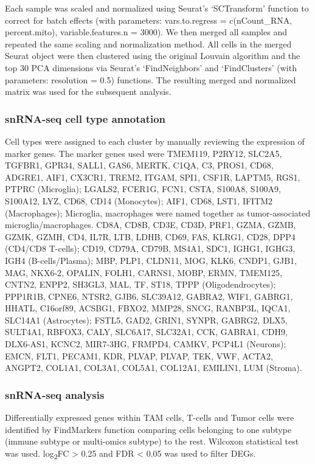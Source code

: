 Each sample was scaled and normalized using Seurat’s `SCTransform' function to correct for batch effects (with parameters: vars.to.regress = c(\textquotedbl{}nCount\_RNA\textquotedbl{}, \textquotedbl{}percent.mito\textquotedbl{}), variable.features.n = 3000). We then merged all samples and repeated the same scaling and normalization method. All cells in the merged Seurat object were then clustered using the original Louvain algorithm \cite{blondelvd_lefebvree:FastUnfolding2008} and the top 30 PCA dimensions via Seurat's `FindNeighbors' and `FindClusters' (with parameters: resolution = 0.5) functions. The resulting merged and normalized matrix was used for the subsequent analysis.

\subsubsection{snRNA-seq cell type annotation}
Cell types were assigned to each cluster by manually reviewing the expression of marker genes. The marker genes used were TMEM119, P2RY12, SLC2A5, TGFBR1, GPR34, SALL1, GAS6, MERTK, C1QA, C3, PROS1, CD68, ADGRE1, AIF1, CX3CR1, TREM2, ITGAM, SPI1, CSF1R, LAPTM5, RGS1, PTPRC (Microglia); LGALS2, FCER1G, FCN1, CSTA, S100A8, S100A9, S100A12, LYZ, CD68, CD14 (Monocytes); AIF1, CD68, LST1, IFITM2 (Macrophages); Microglia, macrophages were named together as tumor-associated microglia/macrophages. CD8A, CD8B, CD3E, CD3D, PRF1, GZMA, GZMB, GZMK, GZMH, CD4, IL7R, LTB, LDHB, CD69, FAS, KLRG1, CD28, DPP4 (CD4/CD8 T-cells); CD19, CD79A, CD79B, MS4A1, SDC1, IGHG1, IGHG3, IGH4 (B-cells/Plasma); MBP, PLP1, CLDN11, MOG, KLK6, CNDP1, GJB1, MAG, NKX6-2, OPALIN, FOLH1, CARNS1, MOBP, ERMN, TMEM125, CNTN2, ENPP2, SH3GL3, MAL, TF, ST18, TPPP (Oligodendrocytes); PPP1R1B, CPNE6, NTSR2, GJB6, SLC39A12, GABRA2, WIF1, GABRG1, HHATL, C16orf89, ACSBG1, FBXO2, MMP28, SNCG, RANBP3L, IQCA1, SLC14A1 (Astrocytes); FSTL5, GAD2, GRIN1, SYNPR, GABRG2, DLX5, SULT4A1, RBFOX3, CALY, SLC6A17, SLC32A1, CCK, GABRA1, CDH9, DLX6-AS1, KCNC2, MIR7-3HG, FRMPD4, CAMKV, PCP4L1 (Neurons); EMCN, FLT1, PECAM1, KDR, PLVAP, PLVAP, TEK, VWF, ACTA2, ANGPT2, COL1A1, COL3A1, COL5A1, COL12A1, EMILIN1, LUM (Stroma).

\subsubsection{snRNA-seq analysis}
Differentially expressed genes within TAM cells, T-cells and Tumor cells were identified by FindMarkers function comparing cells belonging to one subtype (immune subtype or multi-omics subtype) to the rest. Wilcoxon statistical test was used. log\textsubscript{2}FC > 0.25 and FDR < 0.05 was used to filter DEGs.


